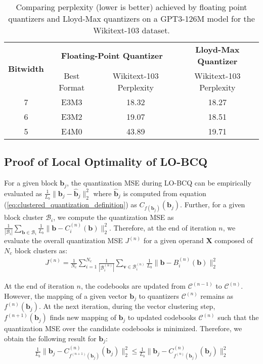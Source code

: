\begin{table}[h]\scriptsize
\begin{center}
\caption{\label{tab:FP7_vs_LM7} \small Comparing perplexity (lower is better) achieved by floating point quantizers and Lloyd-Max quantizers on a GPT3-126M model for the Wikitext-103 dataset.}
\begin{tabular}{c|cc|c}
\hline
 \multirow{2}{*}{\textbf{Bitwidth}} & \multicolumn{2}{|c|}{\textbf{Floating-Point Quantizer}} & \textbf{Lloyd-Max Quantizer} \\
 & Best Format & Wikitext-103 Perplexity & Wikitext-103 Perplexity \\
\hline
7 & E3M3 & 18.32 & 18.27 \\
6 & E3M2 & 19.07 & 18.51 \\
5 & E4M0 & 43.89 & 19.71 \\
\hline
\end{tabular}
\end{center}
\end{table}

\subsection{Proof of Local Optimality of LO-BCQ}
\label{subsec:lobcq_opt_proof}
For a given block $\bm{b}_j$, the quantization MSE during LO-BCQ can be empirically evaluated as $\frac{1}{L_b}\lVert \bm{b}_j- \bm{\hat{b}}_j\rVert^2_2$ where $\bm{\hat{b}}_j$ is computed from equation (\ref{eq:clustered_quantization_definition}) as $C_{f(\bm{b}_j)}(\bm{b}_j)$. Further, for a given block cluster $\mathcal{B}_i$, we compute the quantization MSE as $\frac{1}{|\mathcal{B}_{i}|}\sum_{\bm{b} \in \mathcal{B}_{i}} \frac{1}{L_b}\lVert \bm{b}- C_i^{(n)}(\bm{b})\rVert^2_2$. Therefore, at the end of iteration $n$, we evaluate the overall quantization MSE $J^{(n)}$ for a given operand $\bm{X}$ composed of $N_c$ block clusters as:
\begin{align*}
    \label{eq:mse_iter_n}
    J^{(n)} = \frac{1}{N_c} \sum_{i=1}^{N_c} \frac{1}{|\mathcal{B}_{i}^{(n)}|}\sum_{\bm{v} \in \mathcal{B}_{i}^{(n)}} \frac{1}{L_b}\lVert \bm{b}- B_i^{(n)}(\bm{b})\rVert^2_2
\end{align*}

At the end of iteration $n$, the codebooks are updated from $\mathcal{C}^{(n-1)}$ to $\mathcal{C}^{(n)}$. However, the mapping of a given vector $\bm{b}_j$ to quantizers $\mathcal{C}^{(n)}$ remains as  $f^{(n)}(\bm{b}_j)$. At the next iteration, during the vector clustering step, $f^{(n+1)}(\bm{b}_j)$ finds new mapping of $\bm{b}_j$ to updated codebooks $\mathcal{C}^{(n)}$ such that the quantization MSE over the candidate codebooks is minimized. Therefore, we obtain the following result for $\bm{b}_j$:
\begin{align*}
\frac{1}{L_b}\lVert \bm{b}_j - C_{f^{(n+1)}(\bm{b}_j)}^{(n)}(\bm{b}_j)\rVert^2_2 \le \frac{1}{L_b}\lVert \bm{b}_j - C_{f^{(n)}(\bm{b}_j)}^{(n)}(\bm{b}_j)\rVert^2_2
\end{align*}

